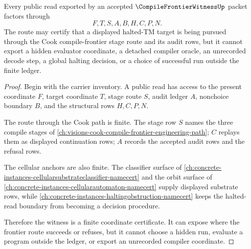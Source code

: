 \begin{theorem}
\label{thm:compile-frontier-witness-nonchoice-boundary}
Every public read exported by an accepted $\CompileFrontierWitnessUp$ packet factors through
$$
F,T,S,A,B,H,C,P,N .
$$
The route may certify that a displayed halted-TM target is being pursued through the Cook compile-frontier stage route and its audit rows, but it cannot export a hidden evaluator coordinate, a detached compiler oracle, an unrecorded decode step, a global halting decision, or a choice of successful run outside the finite ledger.
\end{theorem}
\begin{proof}
Begin with the carrier inventory. A public read has access to the present coordinate $F$, target coordinate $T$, stage route $S$, audit ledger $A$, nonchoice boundary $B$, and the structural rows $H,C,P,N$.

The route through the Cook path is finite. The stage row $S$ names the three compile stages of \autoref{ch:visions-cook-compile-frontier-engineering-path}; $C$ replays them as displayed continuation rows; $A$ records the accepted audit rows and the refusal rows.

The cellular anchors are also finite. The classifier surface of \autoref{ch:concrete-instances-cellularsubstrateclassifier-namecert} and the orbit surface of \autoref{ch:concrete-instances-cellularautomaton-namecert} supply displayed substrate rows, while \autoref{ch:concrete-instances-haltingobstruction-namecert} keeps the halted-read boundary from becoming a decision procedure.

Therefore the witness is a finite coordinate certificate. It can expose where the frontier route succeeds or refuses, but it cannot choose a hidden run, evaluate a program outside the ledger, or export an unrecorded compiler coordinate.
\end{proof}

